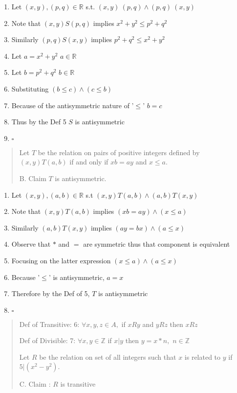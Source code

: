 \documentclass[12pt]{article}
\begin{document}
\begin{enumerate}
  \begin{enumerate}
  \item Let $(x,y),(p,q) \in \mathbb{R}$ s.t. $(x,y)~(p,q) \wedge
    (p,q) ~ (x,y)$
  \item Note that $(x,y)S(p,q)$ implies $x^2+y^2 \leq p^2+q^2$
  \item Similarly $(p,q)S(x,y)$ implies $p^2 + q^2 \leq x^2+y^2$
  \item Let $a = x^2+y^2$ $a\in\mathbb{R}$
  \item Let $b = p^2+q^2$ $b\in\mathbb{R}$
  \item Substituting $(b \leq c) \wedge (c \leq b)$
  \item Because of the antisymmetric nature of '$\leq$' $b=c$
  \item Thus by the Def 5 $S$ is antisymmetric
  \item $\square$
  \end{enumerate}

  \begin{quote}
  \item Let $T$ be the relation on pairs of positive integers defined
    by $(x,y)T(a,b)$ if and only if $xb = ay$ and $x \le a$.
  \item B. Claim $T$ is antisymmetric.
  \end{quote}

  \begin{enumerate}
  \item Let $(x,y),(a,b)\in\mathbb{R}$ s.t $(x,y)T(a,b) \wedge
    (a,b)T(x,y)$
  \item Note that $(x,y)T(a,b)$ implies $(xb=ay) \wedge (x \leq a)$
  \item Similarly $(a,b)T(x,y)$ implies $(ay=bx) \wedge (a \leq x)$
  \item Observe that $*$ and $=$ are symmetric thus that component is
    equivalent
  \item Focusing on the latter expression $(x \leq a) \wedge (a \leq
    x)$
  \item Because '$\leq$' is antisymmetric, $a=x$
  \item Therefore by the Def of 5, $T$ is antisymmetric
  \item $\square$
  \end{enumerate}

  \newpage

  \begin{quote}
  \item Def of Transitive: 6: $\forall x,y,z \in A,$ if $xRy$ and $yRz$ then $xRz$ 
  \item Def of Divisible: 7: $\forall x,y \in \mathbb{Z}$ if $x|y$ then $y=x*n,$ $n\in\mathbb{Z}$ 
  \item Let $R$ be the relation on set of all integers such that $x$
    is related to $y$ if $5 |(x^2-y^2)$.
  \item C. Claim : $R$ is transitive
  \end{quote}


\end{enumerate}
\end{document}
